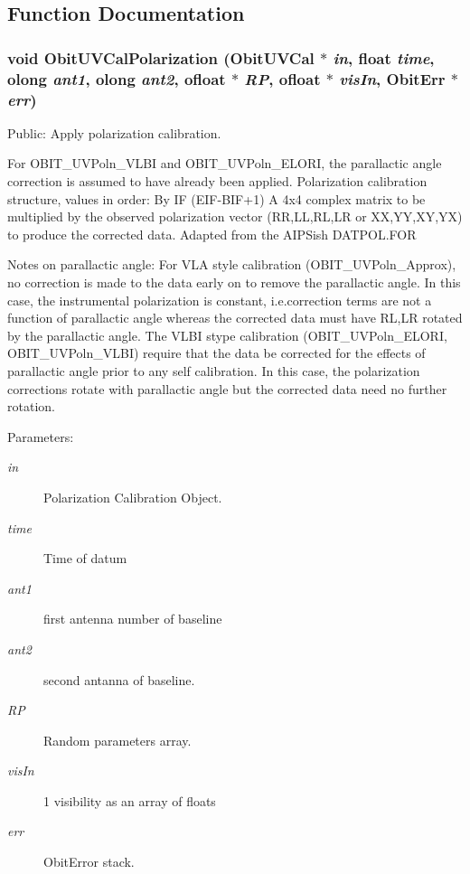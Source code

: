 \subsection{Function Documentation}
\subsubsection{\setlength{\rightskip}{0pt plus 5cm}void Obit\-UVCal\-Polarization ({\bf Obit\-UVCal} $\ast$ {\em in}, float {\em time}, {\bf olong} {\em ant1}, {\bf olong} {\em ant2}, {\bf ofloat} $\ast$ {\em RP}, {\bf ofloat} $\ast$ {\em vis\-In}, {\bf Obit\-Err} $\ast$ {\em err})}\label{ObitUVCalPolarization_8h_a1}


Public: Apply polarization calibration. 

For OBIT\_\-UVPoln\_\-VLBI and OBIT\_\-UVPoln\_\-ELORI, the parallactic angle correction is assumed to have already been applied. Polarization calibration structure, values in order: By IF (EIF-BIF+1) A 4x4 complex matrix to be multiplied by the observed polarization vector (RR,LL,RL,LR or XX,YY,XY,YX) to produce the corrected data. Adapted from the AIPSish DATPOL.FOR

Notes on parallactic angle: For VLA style calibration (OBIT\_\-UVPoln\_\-Approx), no correction is made to the data early on to remove the parallactic angle. In this case, the instrumental polarization is constant, i.e.correction terms are not a function of parallactic angle whereas the corrected data must have RL,LR rotated by the parallactic angle. The VLBI stype calibration (OBIT\_\-UVPoln\_\-ELORI, OBIT\_\-UVPoln\_\-VLBI) require that the data be corrected for the effects of parallactic angle prior to any self calibration. In this case, the polarization corrections rotate with parallactic angle but the corrected data need no further rotation. \begin{Desc}
\item[Parameters:]
\begin{description}
\item[{\em in}]Polarization Calibration Object. \item[{\em time}]Time of datum \item[{\em ant1}]first antenna number of baseline \item[{\em ant2}]second antanna of baseline. \item[{\em RP}]Random parameters array. \item[{\em vis\-In}]1 visibility as an array of floats \item[{\em err}]Obit\-Error stack. \end{description}
\end{Desc}
